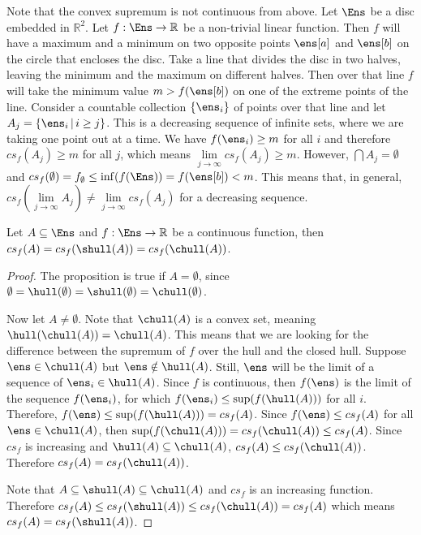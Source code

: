 \begin{mathSection}

\begin{remark}
	Note that the convex supremum is not continuous from above. Let $\Ens$ be a disc embedded in $\mathbb{R}^2$. Let $f : \Ens \to \mathbb{R}$ be a non-trivial linear function. Then $f$ will have a maximum and a minimum on two opposite points $\ens[a]$ and $\ens[b]$ on the circle that encloses the disc. Take a line that divides the disc in two halves, leaving the minimum and the maximum on different halves. Then over that line $f$ will take the minimum value $m > f(\ens[b])$ on one of the extreme points of the line. Consider a countable collection $\{\ens_i\}$ of points over that line and let $A_j = \{ \ens_i \, | \, i \geq j \}$. This is a decreasing sequence of infinite sets, where we are taking one point out at a time.  We have $f(\ens_i) \geq m$ for all $i$ and therefore $cs_f(A_j) \geq m$ for all $j$, which means $\lim\limits_{j \to \infty} cs_f(A_j) \geq m$. However, $\bigcap A_j = \emptyset$ and $cs_f(\emptyset) = f_{\emptyset} \leq \inf(f(\Ens)) = f(\ens[b]) < m$. This means that, in general, $cs_f(\lim\limits_{j \to \infty} A_j) \neq \lim\limits_{j \to \infty} cs_f(A_j)$ for a decreasing sequence.
\end{remark}

\begin{prop}\label{pm-es-convexSupremumContinuous}
	Let $A \subseteq \Ens$ and $f: \Ens \to \mathbb{R}$ be a continuous function, then $cs_f(A) = cs_f(\shull(A)) = cs_f(\chull(A))$.
\end{prop}

\begin{proof}
	The proposition is true if $A = \emptyset$, since $\emptyset = \hull(\emptyset) = \shull(\emptyset) = \chull(\emptyset)$.
	
	Now let $A \neq \emptyset$. Note that $\chull(A)$ is a convex set, meaning $\hull(\chull(A)) = \chull(A)$. This means that we are looking for the difference between the supremum of $f$ over the hull and the closed hull. Suppose $\ens \in \chull(A)$ but $\ens \notin \hull(A)$. Still, $\ens$ will be the limit of a sequence of $\ens_i \in \hull(A)$. Since $f$ is continuous, then $f(\ens)$ is the limit of the sequence $f(\ens_i)$, for which $f(\ens_i) \leq \sup(f(\hull(A)))$ for all $i$. Therefore, $f(\ens) \leq \sup(f(\hull(A))) = cs_f(A)$. Since $f(\ens) \leq cs_f(A)$ for all $\ens \in \chull(A)$, then $\sup(f(\chull(A))) = cs_f(\chull(A)) \leq cs_f(A)$. Since $cs_f$ is increasing and $\hull(A) \subseteq \chull(A)$, $cs_f(A) \leq cs_f(\chull(A))$. Therefore $cs_f(A) = cs_f(\chull(A))$.
	
	Note that $A \subseteq \shull(A) \subseteq \chull(A)$ and $cs_f$ is an increasing function. Therefore $cs_f(A) \leq cs_f(\shull(A)) \leq cs_f(\chull(A)) = cs_f(A)$ which means $cs_f(A) = cs_f(\shull(A))$.
\end{proof}

\end{mathSection}

